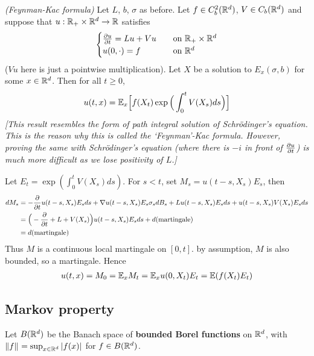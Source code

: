 \documentclass[12pt,a4paper]{article}
\newenvironment{proof}
{\begin{changemargin}{0.5cm}{0.5cm} 
	}%
	{\end{changemargin}
}
\newenvironment{p}
{\begin{proof} 
	}%
	{\end{proof}
}
\begin{document}
\thm \emph{(Feynman-Kac formula)} Let $L$, $b$, $\sigma$ as before. Let $f\in C_b^2(\mathbb{R}^d)$, $V\in C_b(\mathbb{R}^d)$ and suppose that $u: \mathbb{R}_+ \times \mathbb{R}^d \rightarrow \mathbb{R}$ satisfies
\begin{align*}
\begin{cases}
\frac{\partial u}{\partial t} = Lu + Vu \quad &\text{on } \mathbb{R}_+ \times \mathbb{R}^d\\
u(0, \cdot) = f\quad &\text{on }\mathbb{R}^d
\end{cases}
\end{align*}
($Vu$ here is just a pointwise multiplication). Let $X$ be a solution to $E_x(\sigma, b)$ for some $x\in \mathbb{R}^d$. Then for all $t\geq 0$,
\begin{align*}
u(t,x) = \mathbb{E}_x \Big[ f(X_t) \exp \Big( \int_0^t V(X_s) ds \Big) \Big]
\end{align*}
\emph{[This result resembles the form of path integral solution of Schr\"odinger's equation. This is the reason why this is called the `Feynman'-Kac formula. However, proving the same with Schr\"odinger's equation (where there is $-i$ in front of $\frac{\partial u}{\partial t}$) is much more difficult as we lose positivity of $L$.]}
\begin{p}
\pf Let $E_t = \exp (\int_0^t V(X_s) ds)$. For $s<t$, set $M_s = u(t-s, X_s) E_s$, then
\begin{align*}
dM_s &= - \frac{\partial }{\partial t} u(t-s, X_s) E_s ds + \nabla u(t-s, X_s) E_s\sigma_s dB_s + L u(t-s, X_s) E_s ds + u(t-s, X_s) V(X_s) E_s ds \\
&= \Big( -\frac{\partial}{\partial t} + L  + V(X_s) \Big)u(t-s, X_s) E_s ds + d(\text{martingale}) \\
&= d(\text{martingale})
\end{align*}
Thus $M$ is a continuous local martingale on $[0,t]$. by assumption, $M$ is also bounded, so a martingale. Hence
\begin{align*}
u(t,x) = M_0 = \mathbb{E}_x M_t = \mathbb{E}_x u(0, X_t) E_t = \mathbb{E} (f(X_t) E_t)
\end{align*}
\eop
\end{p}

\subsection{Markov property}

Let $B(\mathbb{R}^d)$ be the Banach space of \textbf{bounded Borel functions} on $\mathbb{R}^d$, with $\snorms{f}{} = \sup_{x\in \reals^d} |f(x)|$ for $f\in B(\mathbb{R}^d)$.
\s
\end{document}
